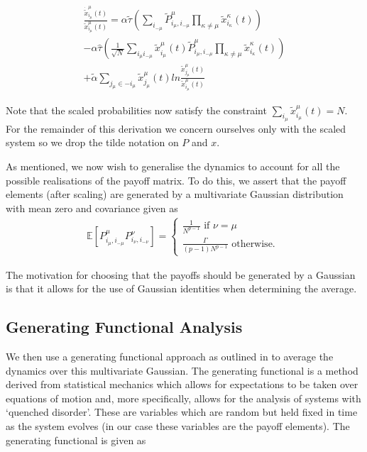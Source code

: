 \documentclass[sigconf,anonymous]{aamas}
\newcommand{\payoff}[2]{P^{#2}_{#1_#2, #1_{-#2}}}
\newcommand{\txmu}[2]{\tilde{x}_{#1_#2}^{#2}(t)}
\newcommand{\dtxmu}[2]{\dot{\tilde{x}}_{#1_#2}^{#2}(t)}
\newcommand{\tpayoff}[2]{\tilde{P}^{#2}_{#1_#2, #1_{-#2}}}
\newcommand{\talpha}{\tilde{\alpha}}
\newcommand{\ttau}{\tilde{\tau}}
\newcommand{\htau}{\hat{\tau}}
\begin{document}
\begin{equation}
\begin{split}
    \label{eqn::scaledEOM}
    \frac{\dtxmu{i}{\mu}}{\txmu{i}{\mu}} = \alpha \ttau \left ( \sum_{i_{-\mu}} \tpayoff{i}{\mu} \prod_{\kappa \neq \mu} \txmu{i}{\kappa} \right ) \\ - \alpha \htau \left ( \frac{1}{\sqrt{N}} \sum_{i_\mu i_{-\mu}} \txmu{i}{\mu} \tpayoff{i}{\mu} \prod_{\kappa \neq \mu} \txmu{i}{\kappa} \right ) \\ + \talpha \sum_{j_\mu \in -i_\mu} \txmu{j}{\mu} ln \frac{\txmu{j}{\mu}}{\txmu{i}{\mu}}
\end{split}
\end{equation}

Note that the scaled probabilities now satisfy the constraint $\sum_{i_\mu} \txmu{i}{\mu} = N$. For the remainder of this derivation we concern ourselves only with the scaled system so we drop the tilde notation on $P$ and $x$. 

As mentioned, we now wish to generalise the dynamics to account for all the possible realisations of the payoff matrix. To do this, we assert that the payoff elements (after scaling) are generated by a multivariate Gaussian distribution with mean zero and covariance given as
%
\begin{equation}
\label{eqn::Payoffs}
    \begin{split}
        \mathbb{E}\left [ \payoff{i}{\mu} \payoff{i}{\nu} \right] = \begin{cases}
        \frac{1}{N^{p-1}}  \text{ if } \nu = \mu \\
        \frac{\Gamma}{(p-1) N^{p-1}} \text{ otherwise. }
        \end{cases}
    \end{split}
\end{equation}

The motivation for choosing that the payoffs should be generated by a Gaussian is that it allows for the use of Gaussian identities when determining the average.

\subsection{Generating Functional Analysis}

We then use a generating functional approach as outlined in \cite{Mezard1986} to average the dynamics over this multivariate Gaussian. The generating functional is a method derived from statistical mechanics which allows for expectations to be taken over equations of motion and, more specifically, allows for the analysis of systems with `quenched disorder'. These are variables which are random but held fixed in time as the system evolves (in our case these variables are the payoff elements). The generating functional is given as \cite{SpinGlassTheory}
\end{document}
